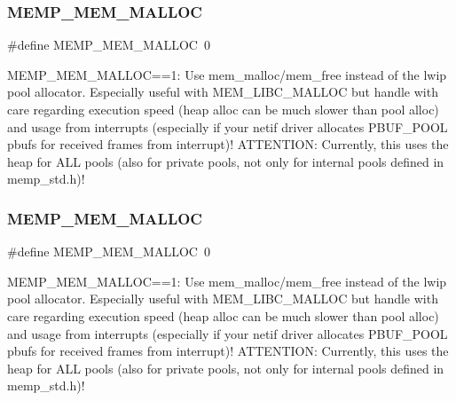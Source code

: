 \subsubsection{\texorpdfstring{M\+E\+M\+P\+\_\+\+M\+E\+M\+\_\+\+M\+A\+L\+L\+OC}{MEMP\_MEM\_MALLOC}\hspace{0.1cm}{\footnotesize\ttfamily [1/2]}}
{\footnotesize\ttfamily \#define M\+E\+M\+P\+\_\+\+M\+E\+M\+\_\+\+M\+A\+L\+L\+OC~0}

M\+E\+M\+P\+\_\+\+M\+E\+M\+\_\+\+M\+A\+L\+L\+OC==1\+: Use mem\+\_\+malloc/mem\+\_\+free instead of the lwip pool allocator. Especially useful with M\+E\+M\+\_\+\+L\+I\+B\+C\+\_\+\+M\+A\+L\+L\+OC but handle with care regarding execution speed (heap alloc can be much slower than pool alloc) and usage from interrupts (especially if your netif driver allocates P\+B\+U\+F\+\_\+\+P\+O\+OL pbufs for received frames from interrupt)! A\+T\+T\+E\+N\+T\+I\+ON\+: Currently, this uses the heap for A\+LL pools (also for private pools, not only for internal pools defined in memp\+\_\+std.\+h)! \mbox{\label{group__lwip__opts__mem_gae93af697d27bbcefa6a28052d90f2f38}} 
\subsubsection{\texorpdfstring{M\+E\+M\+P\+\_\+\+M\+E\+M\+\_\+\+M\+A\+L\+L\+OC}{MEMP\_MEM\_MALLOC}\hspace{0.1cm}{\footnotesize\ttfamily [2/2]}}
{\footnotesize\ttfamily \#define M\+E\+M\+P\+\_\+\+M\+E\+M\+\_\+\+M\+A\+L\+L\+OC~0}

M\+E\+M\+P\+\_\+\+M\+E\+M\+\_\+\+M\+A\+L\+L\+OC==1\+: Use mem\+\_\+malloc/mem\+\_\+free instead of the lwip pool allocator. Especially useful with M\+E\+M\+\_\+\+L\+I\+B\+C\+\_\+\+M\+A\+L\+L\+OC but handle with care regarding execution speed (heap alloc can be much slower than pool alloc) and usage from interrupts (especially if your netif driver allocates P\+B\+U\+F\+\_\+\+P\+O\+OL pbufs for received frames from interrupt)! A\+T\+T\+E\+N\+T\+I\+ON\+: Currently, this uses the heap for A\+LL pools (also for private pools, not only for internal pools defined in memp\+\_\+std.\+h)! \mbox{\label{group__lwip__opts__mem_ga27fdd01194a42fc41a7716b72cdb49e3}} 
